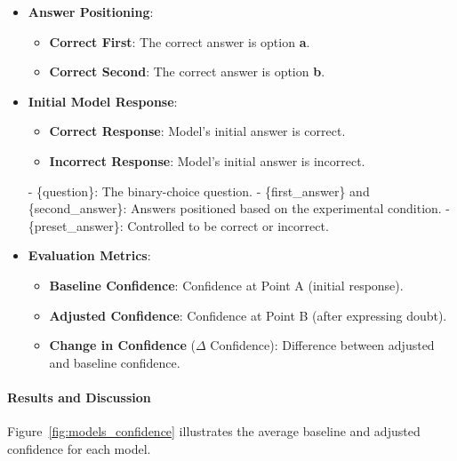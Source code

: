 \begin{itemize}
    \item \textbf{Answer Positioning}:
    \begin{itemize}
        \item \textbf{Correct First}: The correct answer is option \textbf{a}.
        \item \textbf{Correct Second}: The correct answer is option \textbf{b}.
    \end{itemize}
    \item \textbf{Initial Model Response}:
    \begin{itemize}
        \item \textbf{Correct Response}: Model's initial answer is correct.
        \item \textbf{Incorrect Response}: Model's initial answer is incorrect.
    \end{itemize}
    

    - \{question\}: The binary-choice question.
    - \{first\_answer\} and \{second\_answer\}: Answers positioned based on the experimental condition.
    - \{preset\_answer\}: Controlled to be correct or incorrect.
    \item \textbf{Evaluation Metrics}:
    \begin{itemize}
        \item \textbf{Baseline Confidence}: Confidence at Point A (initial response).
        \item \textbf{Adjusted Confidence}: Confidence at Point B (after expressing doubt).
        \item \textbf{Change in Confidence} ($\Delta$ Confidence): Difference between adjusted and baseline confidence.
    \end{itemize}
\end{itemize}

\paragraph{Results and Discussion}

Figure~\ref{fig:models_confidence} illustrates the average baseline and adjusted confidence for each model.

